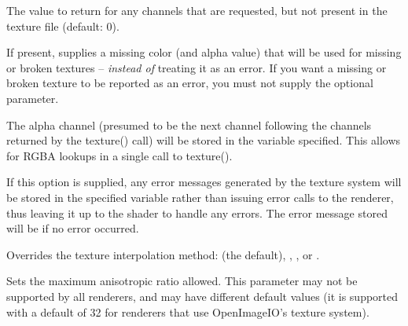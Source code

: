 \documentclass[11pt,letterpaper]{book}
\begin{document}
\vspace{12pt}
The value to return for any channels that are requested,
but not present in the texture file (default: 0).
\apiend
\vspace{-16pt}

\vspace{12pt}
If present, supplies a missing color (and alpha value) that will
be used for missing or broken textures -- \emph{instead of} treating
it as an error.  If you want a missing or broken texture to be reported
as an error, you must not supply the optional 
parameter.
\apiend
\vspace{-16pt}

\vspace{12pt}
The alpha channel (presumed to be the next channel following the
channels returned by the {\cf texture()} call) will be stored in the
variable specified.  This allows for RGBA lookups in a single call to
{\cf texture()}.
\apiend
\vspace{-16pt}

\vspace{12pt}
If this option is supplied, any error messages generated by the texture
system will be stored in the specified variable rather than issuing error
calls to the renderer, thus leaving it up to the shader to handle any
errors. The error message stored will be \qkw{} if no error occurred.
\apiend
\vspace{-16pt}

\vspace{12pt}
Overrides the texture interpolation method:  (the 
default), , , or .
\apiend
\vspace{-16pt}

\vspace{12pt}
Sets the maximum anisotropic ratio allowed. This parameter may not be
supported by all renderers, and may have different default values (it is
supported with a default of 32 for renderers that use OpenImageIO's texture
system).
\NEW %
\apiend
\vspace{-16pt}

\apiend

\end{document}
